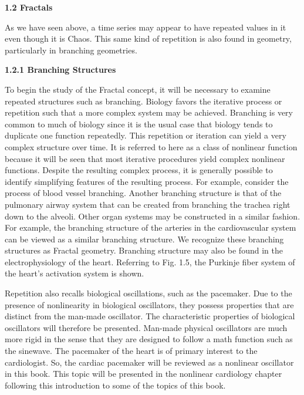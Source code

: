 \documentclass{article}
\begin{document}
\hfill

\textbf{1.2 Fractals}

\hfill

As we have seen above, a time series may appear to have repeated values in it even though it is Chaos. This same kind of repetition is also found in geometry, particularly
in branching geometries.

\hfill

\textbf{1.2.1 Branching Structures}

\hfill


To begin the study of the Fractal concept, it will be necessary to examine repeated
structures such as branching. Biology favors the iterative process or repetition such
that a more complex system may be achieved. Branching is very common to much
of biology since it is the usual case that biology tends to duplicate one function repeatedly. This repetition or iteration can yield a very complex structure over time.
It is referred to here as a class of nonlinear function because it will be seen that most
iterative procedures yield complex nonlinear functions. Despite the resulting complex
process, it is generally possible to identify simplifying features of the resulting
process. For example, consider the process of blood vessel branching. Another
branching structure is that of the pulmonary airway system that can be created from
branching the trachea right down to the alveoli. Other organ systems may be constructed
in a similar fashion. For example, the branching structure of the arteries in
the cardiovascular system can be viewed as a similar branching structure. We recognize
these branching structures as Fractal geometry. Branching structure may also
be found in the electrophysiology of the heart. Referring to Fig. 1.5, the Purkinje
fiber system of the heart’s activation system is shown.

\hfill

Repetition also recalls biological oscillations, such as the pacemaker. Due to the
presence of nonlinearity in biological oscillators, they possess properties that are
distinct from the man-made oscillator. The characteristic properties of biological
oscillators will therefore be presented. Man-made physical oscillators are much
more rigid in the sense that they are designed to follow a math function such as the
sinewave. The pacemaker of the heart is of primary interest to the cardiologist. So,
the cardiac pacemaker will be reviewed as a nonlinear oscillator in this book. This
topic will be presented in the nonlinear cardiology chapter following this introduction
to some of the topics of this book.
\end{document}
